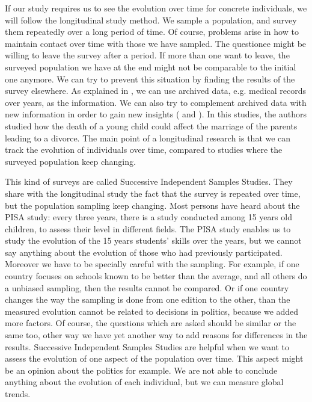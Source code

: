 \documentclass{report}
\begin{document}
If our study requires us to see the evolution over time for concrete individuals, we will follow the longitudinal study method. We sample a population, and survey them repeatedly over a long period of time. Of course, problems arise in how to maintain contact over time with those we have sampled. The questionee might be willing to leave the survey after a period. If more than one want to leave, the surveyed population we have at the end might not be comparable to the initial one anymore.
We can try to prevent this situation by finding the results of the survey elsewhere. As explained in \cite{JohnShaughnessyEugeneZechmeister2011}, we can use archived data, e.g. medical records over years, as the information. We can also try to complement archived data with new information in order to gain new insights (\cite{Friedman} and \cite{Tucker}). In this studies, the authors studied how the death of a young child could affect the marriage of the parents leading to a divorce.
The main point of a longitudinal research is that we can track the evolution of individuals over time, compared to studies where the surveyed population keep changing.

This kind of surveys are called Successive Independent Samples Studies. They share with the longitudinal study the fact that the survey is repeated over time, but the population sampling keep changing. Most persons have heard about the PISA study: every three years, there is a study conducted among 15 years old children, to assess their level in different fields. The PISA study enables us to study the evolution of the 15 years students' skills over the years, but we cannot say anything about the evolution of those who had previously participated. Moreover we have to be specially careful with the sampling. For example, if one country focuses on schools known to be better than the average, and all others do a unbiased sampling, then the results cannot be compared.  Or if one country changes the way the sampling is done from one edition to the other, than the measured evolution cannot be related to decisions in politics, because we added more factors. Of course, the questions which are asked should be similar or the same too, other way we have yet another way to add reasons for differences in the results.
Successive Independent Samples Studies are helpful when we want to assess the evolution of one aspect of the population over time. This aspect might be an opinion about the politics for example. We are not able to conclude anything about the evolution of each individual, but we can measure global trends.
\end{document}
